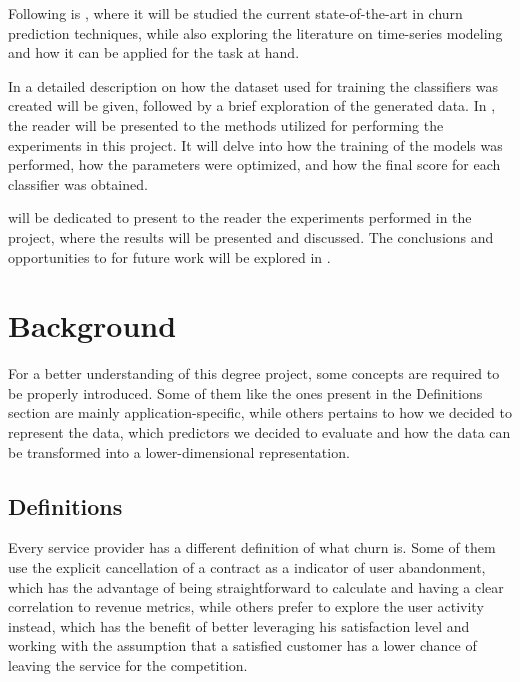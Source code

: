 \documentclass{kththesis}
\begin{document}
Following is , where it will be studied the current state-of-the-art in churn prediction techniques, while also exploring the literature on time-series modeling and how it can be applied for the task at hand. 

In  a detailed description on how the dataset used for training the classifiers was created will be given, followed by a brief exploration of the generated data. In , the reader will be presented to the methods utilized for performing the experiments in this project. It will delve into how the training of the models was performed, how the parameters were optimized, and how the final score for each classifier was obtained.

 will be dedicated to present to the reader the experiments performed in the project, where the results will be presented and discussed. The conclusions and opportunities to for future work will be explored in . 


\chapter{Background}
\label{cha:background}

For a better understanding of this degree project, some concepts are required to be properly introduced. Some of them like the ones present in the Definitions section are mainly application-specific, while others pertains to how we decided to represent the data, which predictors we decided to evaluate and how the data can be transformed into a lower-dimensional representation. 

\section{Definitions}
\label{sec:definitions}

Every service provider has a different definition of what churn is. Some of them use the explicit cancellation of a contract as a indicator of user abandonment, which has  the advantage of being straightforward to calculate and having a clear correlation to revenue metrics, while others prefer to explore the user activity instead, which has the benefit of better leveraging his satisfaction level and working with the assumption that a satisfied customer has a lower chance of leaving the service for the competition. 
\end{document}
